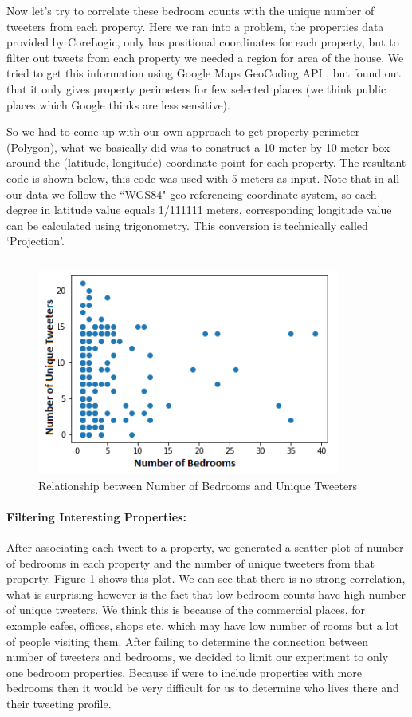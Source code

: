 \documentclass[12pt]{report}
\theoremstyle{named}
\begin{document}
Now let's try to correlate these bedroom counts with the unique number of tweeters from each property. Here we ran into a problem, the properties data provided by CoreLogic, only has positional coordinates for each property, but to filter out tweets from each property we needed a region for area of the house. We tried to get this information using Google Maps GeoCoding API \cite{GoogleGeoCodingAPI}, but found out that it only gives property perimeters for few selected places (we think public places which Google thinks are less sensitive). 

So we had to come up with our own approach to get property perimeter (Polygon), what we basically did was to construct a 10 meter by 10 meter box around the (latitude, longitude) coordinate point for each property. The resultant code is shown below, this code was used with 5 meters as input. Note that in all our data we follow the ``WGS84" geo-referencing coordinate system, so each degree in latitude value equals 1/111111 meters, corresponding longitude value can be calculated using trigonometry. This conversion is technically called `Projection'.

\inputminted{python}{pointToPolygon.py}



\begin{figure}[ht]
\centering
        \includegraphics[width=100mm,scale=1]{Images/BedroomVsTweeters.png}
    \caption{Relationship between Number of Bedrooms and Unique Tweeters}
    \label{fig:BedroomVSTweeters}
\end{figure}
\paragraph{Filtering Interesting Properties:\\}
After associating each tweet to a property, we generated a scatter plot of number of bedrooms in each property and the number of unique tweeters from that property. Figure \ref{fig:BedroomVSTweeters} shows this plot. We can see that there is no strong correlation, what is surprising however is the fact that low bedroom counts have high number of unique tweeters. We think this is because of the commercial places, for example cafes, offices, shops etc. which may have low number of rooms but a lot of people visiting them. 
After failing to determine the connection between number of tweeters and bedrooms, we decided to limit our experiment to only one bedroom properties. Because if were to include properties with more bedrooms then it would be very difficult for us to determine who lives there and their tweeting profile.
\end{document}
